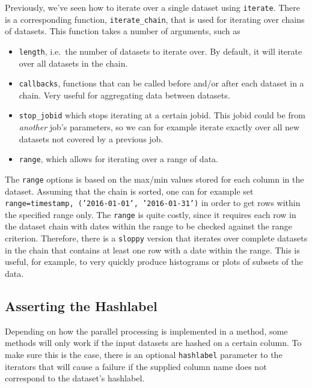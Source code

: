 \documentclass[a4paper]{article}
\begin{document}
Previously, we've seen how to iterate over a single dataset using
\texttt{iterate}.  There is a corresponding function,
\texttt{iterate\_chain}, that is used for iterating over chains of
datasets.  This function takes a number of arguments, such as
\begin{itemize}
\item[] \texttt{length}, i.e.\ the number of datasets to iterate over.
  By default, it will iterate over all datasets in the chain.
\item[] \texttt{callbacks}, functions that can be called before and/or
  after each dataset in a chain.  Very useful for aggregating data
  between datasets.
\item[] \texttt{stop\_jobid} which stops iterating at a certain jobid.
  This jobid could be from \textsl{another} job's parameters, so we
  can for example iterate exactly over all new datasets not covered by
  a previous job.

\item[] \texttt{range}, which allows for iterating over a range of
  data.
\end{itemize}
The \texttt{range} options is based on the max/min values stored for
each column in the dataset.  Assuming that the chain is sorted, one
can for example set \texttt{range={timestamp, ('2016-01-01', '2016-01-31')}}
in order to get rows within the specified range only.  The %
\texttt{range} is quite costly, since it requires each row in the
dataset chain with dates within the range to be checked against the
range criterion.  Therefore, there is a \texttt{sloppy} version that
iterates over complete datasets in the chain that contains at least
one row with a date within the range.  This is useful, for example, to
very quickly produce histograms or plots of subsets of the data.

\clearpage



\subsection{Asserting the Hashlabel}
Depending on how the parallel processing is implemented in a method,
some methods will only work if the input datasets are hashed on a
certain column.  To make sure this is the case, there is an optional
\texttt{hashlabel} parameter to the iterators that will cause a
failure if the supplied column name does not correspond to the
dataset's hashlabel.
\end{document}
